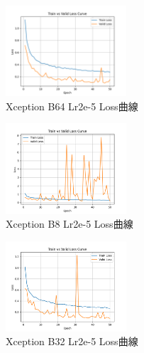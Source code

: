 \begin{figure}[H]
    \centering
    \includegraphics[width=0.40\textwidth]{./img/Xception/P3.png}
    \caption{Xception B64 Lr2e-5 Loss曲線}
    \label{fig:Xception_P3}
\end{figure}
\begin{figure}[H]
    \centering
    \includegraphics[width=0.40\textwidth]{./img/Xception/P4.png}
    \caption{Xception B8 Lr2e-5 Loss曲線}
    \label{fig:Xception_P4}
\end{figure}
\begin{figure}[H]
    \centering
    \includegraphics[width=0.40\textwidth]{./img/Xception/P5.png}
    \caption{Xception B32 Lr2e-5 Loss曲線}
    \label{fig:Xception_P5}
\end{figure}
%
\FloatBarrier

